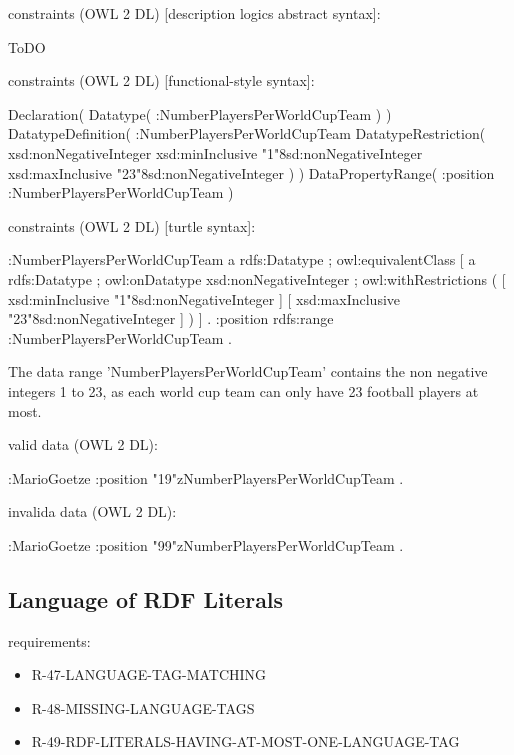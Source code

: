 \documentclass{llncs}
\begin{document}
constraints (OWL 2 DL) [description logics abstract syntax]:

\begin{ex}
ToDO
\end{ex}

constraints (OWL 2 DL) [functional-style syntax]:

\begin{ex}
Declaration( Datatype( :NumberPlayersPerWorldCupTeam ) ) 
DatatypeDefinition( 
    :NumberPlayersPerWorldCupTeam
    DatatypeRestriction( 
        xsd:nonNegativeInteger 
        xsd:minInclusive "1"^^xsd:nonNegativeInteger 
        xsd:maxInclusive "23"^^xsd:nonNegativeInteger ) )     
DataPropertyRange( :position :NumberPlayersPerWorldCupTeam ) 
\end{ex}

constraints (OWL 2 DL) [turtle syntax]:

\begin{ex}
:NumberPlayersPerWorldCupTeam
    a rdfs:Datatype ;
    owl:equivalentClass [
        a rdfs:Datatype ;
        owl:onDatatype xsd:nonNegativeInteger ;
        owl:withRestrictions ( 
            [ xsd:minInclusive "1"^^xsd:nonNegativeInteger ]
            [ xsd:maxInclusive "23"^^xsd:nonNegativeInteger ] ) ] .
:position rdfs:range :NumberPlayersPerWorldCupTeam .
\end{ex}

The data range 'NumberPlayersPerWorldCupTeam' contains the non negative integers 1 to 23, as each world cup team can only have 23 football players at most.

valid data (OWL 2 DL):

\begin{ex}
:MarioGoetze
    :position "19"^^:NumberPlayersPerWorldCupTeam .
\end{ex}

invalida data (OWL 2 DL):

\begin{ex}
:MarioGoetze
    :position "99"^^:NumberPlayersPerWorldCupTeam .
\end{ex}

\subsection{Language of RDF Literals}

requirements:

\begin{itemize}
	\item R-47-LANGUAGE-TAG-MATCHING
  \item R-48-MISSING-LANGUAGE-TAGS
	\item R-49-RDF-LITERALS-HAVING-AT-MOST-ONE-LANGUAGE-TAG
\end{itemize}
\end{document}
